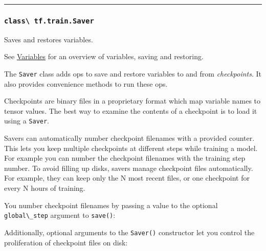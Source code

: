 \begin{center}\rule{0.5\linewidth}{\linethickness}\end{center}

\subsubsection{\texorpdfstring{\lstinline{class\ tf.train.Saver}
}{class tf.train.Saver }}\label{class-tf.train.saver}

Saves and restores variables.

See \href{../../how_tos/variables/index.md}{Variables} for an overview
of variables, saving and restoring.

The \lstinline{Saver} class adds ops to save and restore variables to and
from \emph{checkpoints}. It also provides convenience methods to run
these ops.

Checkpoints are binary files in a proprietary format which map variable
names to tensor values. The best way to examine the contents of a
checkpoint is to load it using a \lstinline{Saver}.

Savers can automatically number checkpoint filenames with a provided
counter. This lets you keep multiple checkpoints at different steps
while training a model. For example you can number the checkpoint
filenames with the training step number. To avoid filling up disks,
savers manage checkpoint files automatically. For example, they can keep
only the N most recent files, or one checkpoint for every N hours of
training.

You number checkpoint filenames by passing a value to the optional
\lstinline{global\_step} argument to \lstinline{save()}:

\begin{Shaded}
\begin{Highlighting}[]
\OperatorTok{=}\NormalTok{) }\OperatorTok{==>} 
\OperatorTok{=}\NormalTok{) }\OperatorTok{==>} 
\end{Highlighting}
\end{Shaded}

Additionally, optional arguments to the \lstinline{Saver()} constructor let
you control the proliferation of checkpoint files on disk:

